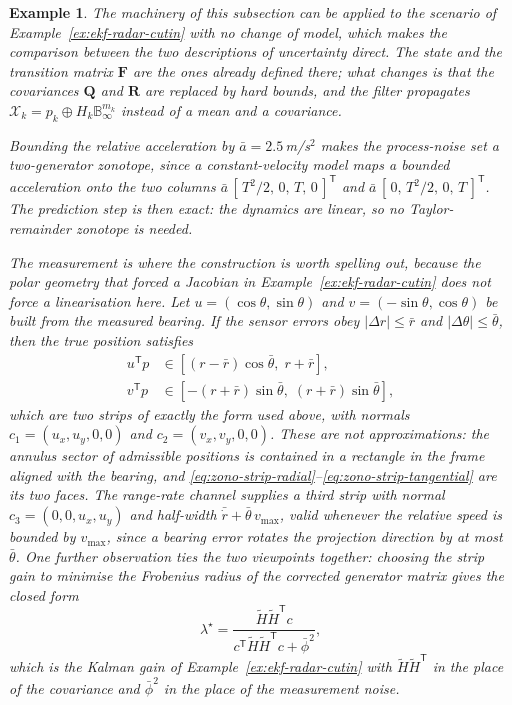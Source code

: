 \documentclass[11pt,oneside,openany]{book}
\newtheorem{example}{Example}[chapter]
\begin{document}
\color{olive}
\begin{example}
\label{ex:zono-radar-cutin}
The machinery of this subsection can be applied to the scenario of
Example~\ref{ex:ekf-radar-cutin} with no change of model, which makes the
comparison between the two descriptions of uncertainty direct. The state and
the transition matrix $\mathbf{F}$ are the ones already defined there; what
changes is that the covariances $\mathbf{Q}$ and $\mathbf{R}$ are replaced by
hard bounds, and the filter propagates $\mathcal{X}_k=p_k\oplus H_k\mathbb{B}_{\infty}^{m_k}$
instead of a mean and a covariance.

Bounding the relative acceleration by $\bar a=2.5$\,m/s$^{2}$ makes the
process-noise set a two-generator zonotope, since a constant-velocity model
maps a bounded acceleration onto the two columns
$\bar a\,[\,T^{2}/2,\,0,\,T,\,0\,]^{\mathsf T}$ and
$\bar a\,[\,0,\,T^{2}/2,\,0,\,T\,]^{\mathsf T}$. The prediction step is then
exact: the dynamics are linear, so no Taylor-remainder zonotope is needed.

The measurement is where the construction is worth spelling out, because the
polar geometry that forced a Jacobian in Example~\ref{ex:ekf-radar-cutin} does
not force a linearisation here. Let $u=(\cos\theta,\sin\theta)$ and
$v=(-\sin\theta,\cos\theta)$ be built from the measured bearing. If the sensor
errors obey $|\Delta r|\le\bar r$ and $|\Delta\theta|\le\bar\theta$, then the
true position satisfies
\begin{align}
u^{\mathsf T}p &\in \left[(r-\bar r)\cos\bar\theta,\; r+\bar r\right],
\label{eq:zono-strip-radial}\\
v^{\mathsf T}p &\in \left[-(r+\bar r)\sin\bar\theta,\; (r+\bar r)\sin\bar\theta\right],
\label{eq:zono-strip-tangential}
\end{align}
which are two strips of exactly the form used above, with normals
$c_{1}=(u_x,u_y,0,0)$ and $c_{2}=(v_x,v_y,0,0)$. These are not approximations:
the annulus sector of admissible positions is contained in a rectangle in the
frame aligned with the bearing, and \eqref{eq:zono-strip-radial}--\eqref{eq:zono-strip-tangential}
are its two faces. The range-rate channel supplies a third strip with normal
$c_{3}=(0,0,u_x,u_y)$ and half-width $\bar{\dot r}+\bar\theta\,v_{\max}$, valid
whenever the relative speed is bounded by $v_{\max}$, since a bearing error
rotates the projection direction by at most $\bar\theta$. One further
observation ties the two viewpoints together: choosing the strip gain to
minimise the Frobenius radius of the corrected generator matrix gives the
closed form
\begin{equation}
\lambda^{\star}=\frac{\widetilde H\widetilde H^{\mathsf T}c}
{c^{\mathsf T}\widetilde H\widetilde H^{\mathsf T}c+\bar\phi^{2}},
\label{eq:zono-optimal-gain}
\end{equation}
which is the Kalman gain of Example~\ref{ex:ekf-radar-cutin} with
$\widetilde H\widetilde H^{\mathsf T}$ in the place of the covariance and
$\bar\phi^{2}$ in the place of the measurement noise.


\end{example}
\end{document}
